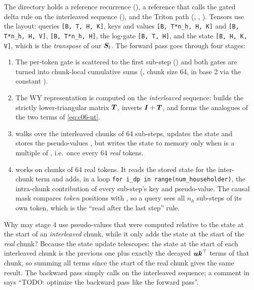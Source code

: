 \begin{implnote}[title={In the code: the dedicated \fla{} kernels}]
The directory 
holds a reference recurrence (), a reference that calls the gated delta rule
on the interleaved sequence (), and the Triton path (,
, ). Tensors use the \fla{}
layout: queries \texttt{[B, T, H, K]}, keys and values \texttt{[B, T*n\_h, H, K]} and
\texttt{[B, T*n\_h, H, V]},  \texttt{[B, T*n\_h, H]}, the log-gate 
\texttt{[B, T, H]}, and the state \texttt{[B, H, K, V]}, which is the \emph{transpose} of our
$\bm{S}_t$. The forward pass  goes through four stages:
\begin{enumerate}
\item The per-token gate is scattered to the first sub-step () and both
gates are turned into chunk-local cumulative sums (, chunk size 64,
in base 2 via the constant ).
\item The WY representation is computed on the \emph{interleaved} sequence:
 builds the strictly lower-triangular matrix $\bm{T}$,
 inverts $\bm{I}+\bm{T}$, and  forms the analogues of
the two terms of \eqref{eq:c06-ut}.
\item {} walks over the interleaved chunks of 64
sub-steps, updates the state and stores the pseudo-values , but writes the state
to memory only when  is a multiple of , i.e.\ once every 64
\emph{real} tokens.
\item {} works on chunks of 64 real tokens. It reads the stored state
for the inter-chunk term and adds, in a loop \texttt{for i\_dp in range(num\_householder)},
the intra-chunk contribution of every sub-step's key and pseudo-value. The causal mask
compares \emph{token} positions with \code{>=}, so a query sees all $n_h$ sub-steps of its own
token, which is the ``read after the last step'' rule.
\end{enumerate}
Why may stage 4 use pseudo-values that were computed relative to the state at the start of an
\emph{interleaved} chunk, while it only adds the state at the start of the \emph{real} chunk?
Because the state update telescopes: the state at the start of each interleaved chunk is the
previous one plus exactly the decayed $\bm{u}\bm{k}^{\top}$ terms of that chunk, so summing all terms
since the start of the real chunk gives the same result. The backward pass simply calls
 on the interleaved sequence; a comment in 
says ``TODO: optimize the backward pass like the forward pass''.
\end{implnote}

